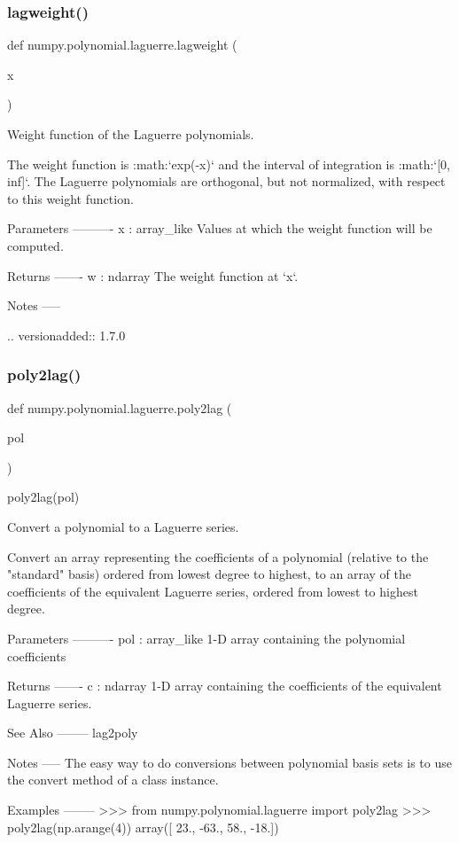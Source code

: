 \subsubsection{\texorpdfstring{lagweight()}{lagweight()}}
{\footnotesize\ttfamily def numpy.\+polynomial.\+laguerre.\+lagweight (\begin{DoxyParamCaption}\item[{}]{x }\end{DoxyParamCaption})}

\begin{DoxyVerb}Weight function of the Laguerre polynomials.

The weight function is :math:`exp(-x)` and the interval of integration
is :math:`[0, \\inf]`. The Laguerre polynomials are orthogonal, but not
normalized, with respect to this weight function.

Parameters
----------
x : array_like
   Values at which the weight function will be computed.

Returns
-------
w : ndarray
   The weight function at `x`.

Notes
-----

.. versionadded:: 1.7.0\end{DoxyVerb}
 \mbox{\label{namespacenumpy_1_1polynomial_1_1laguerre_a8ce4a89a642f9ce56be2c658e09a4f5d}} 
\subsubsection{\texorpdfstring{poly2lag()}{poly2lag()}}
{\footnotesize\ttfamily def numpy.\+polynomial.\+laguerre.\+poly2lag (\begin{DoxyParamCaption}\item[{}]{pol }\end{DoxyParamCaption})}

\begin{DoxyVerb}poly2lag(pol)

Convert a polynomial to a Laguerre series.

Convert an array representing the coefficients of a polynomial (relative
to the "standard" basis) ordered from lowest degree to highest, to an
array of the coefficients of the equivalent Laguerre series, ordered
from lowest to highest degree.

Parameters
----------
pol : array_like
    1-D array containing the polynomial coefficients

Returns
-------
c : ndarray
    1-D array containing the coefficients of the equivalent Laguerre
    series.

See Also
--------
lag2poly

Notes
-----
The easy way to do conversions between polynomial basis sets
is to use the convert method of a class instance.

Examples
--------
>>> from numpy.polynomial.laguerre import poly2lag
>>> poly2lag(np.arange(4))
array([ 23., -63.,  58., -18.])\end{DoxyVerb}
 

